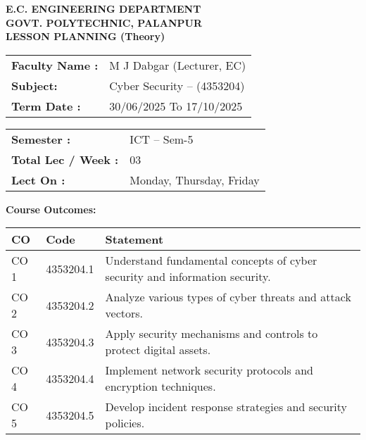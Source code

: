 \documentclass[12pt]{article}
\begin{document}
\begin{center}
\textbf{\large E.C. ENGINEERING DEPARTMENT}\\
\textbf{\large GOVT. POLYTECHNIC, PALANPUR}\\
\vspace{0.2cm}
\textbf{\large LESSON PLANNING (Theory)}
\end{center}

\vspace{0.3cm}

\begin{tabular}{ll}
\textbf{Faculty Name :} & M J Dabgar (Lecturer, EC) \\
\textbf{Subject:} & Cyber Security – (4353204) \\
\textbf{Term Date :} & 30/06/2025 To 17/10/2025 \\
\end{tabular}
\hfill
\begin{tabular}{ll}
\textbf{Semester :} & ICT – Sem-5 \\
\textbf{Total Lec / Week :} & 03 \\
\textbf{Lect On :} & Monday, Thursday, Friday \\
\end{tabular}

\vspace{0.3cm}

\textbf{Course Outcomes:}

\begin{longtable}{|p{1cm}|p{3cm}|p{11cm}|}
\hline
\textbf{CO} & \textbf{Code} & \textbf{Statement} \\
\hline
CO 1 & 4353204.1 & Understand fundamental concepts of cyber security and information security. \\\hline
CO 2 & 4353204.2 & Analyze various types of cyber threats and attack vectors. \\\hline
CO 3 & 4353204.3 & Apply security mechanisms and controls to protect digital assets. \\\hline
CO 4 & 4353204.4 & Implement network security protocols and encryption techniques. \\\hline
CO 5 & 4353204.5 & Develop incident response strategies and security policies. \\\hline
\end{longtable}

\vspace{0.3cm}
\end{document}
